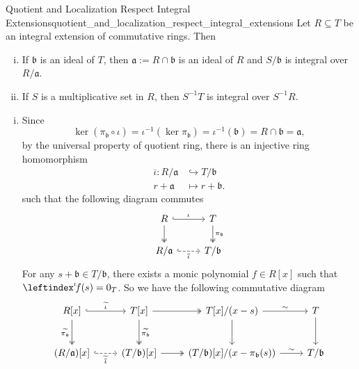 \begin{proposition}{Quotient and Localization Respect Integral Extensions}{quotient_and_localization_respect_integral_extensions}
    Let $R\subseteq T$ be an integral extension of commutative rings. Then 
    \begin{enumerate}[(i)]
        \item If $\mathfrak{b}$ is an ideal of $T$, then $\mathfrak{a}:= R\cap \mathfrak{b}$ is an ideal of $R$ and $S/\mathfrak{b}$ is integral over $R/\mathfrak{a}$.
        \item If $S$ is a multiplicative set in $R$, then $S^{-1}T$ is integral over $S^{-1}R$.
    \end{enumerate}
\end{proposition}
\begin{prf}
    \begin{enumerate}[(i)]
        \item Since 
    \[
    \ker (\pi_{\mathfrak{b}}\circ \iota )= \iota^{-1}\left(\ker \pi_{\mathfrak{b}}\right)=\iota^{-1}\left(\mathfrak{b}\right)=R \cap \mathfrak{b}=\mathfrak{a},
    \]
    by the universal property of quotient ring, there is an injective ring homomorphism 
    \begin{align*}
        \overline{\iota}:R/\mathfrak{a}&\hookrightarrow T/\mathfrak{b}\\
        r+\mathfrak{a}&\longmapsto r+\mathfrak{b}.
    \end{align*} such that the following diagram commutes
    \[
        \begin{tikzcd}
            R \arrow[r, "\iota", hook] \arrow[d, two heads] & T \arrow[d, "\pi_{\mathfrak{b}}", two heads] \\
            R/\mathfrak{a} \arrow[r, "\overline{\iota}"', dashed, hook]                & T/\mathfrak{b}             
            \end{tikzcd}
    \]
    For any $s + \mathfrak{b}\in T/\mathfrak{b}$, there exists a monic polynomial $f\in R[x]$ such that $\leftindex^{\iota}\!f(s)=0_T$. So we have the following commutative diagram
    \[
        \begin{tikzcd}
            {R[x]} \arrow[r, "\widetilde{\iota}", hook] \arrow[d, "\widetilde{\pi_\mathfrak{a}}"', two heads] & {T[x]} \arrow[d, "\widetilde{\pi_\mathfrak{b}}", two heads] \arrow[r, two heads] & {T[x]/(x-s)} \arrow[d] \arrow[r, "\sim"]           & T \arrow[d]    \\[0.8em]
            {(R/\mathfrak{a})[x]} \arrow[r, "\widetilde{\overline{\iota}}"', dashed, hook]                    & {(T/\mathfrak{b})[x]} \arrow[r, two heads]                                       & {(T/\mathfrak{b})[x]/(x-\pi_{\mathfrak{b}}(s))} \arrow[r, "\sim"] & T/\mathfrak{b}

\end{tikzcd}\]
\end{enumerate}
\end{prf}

